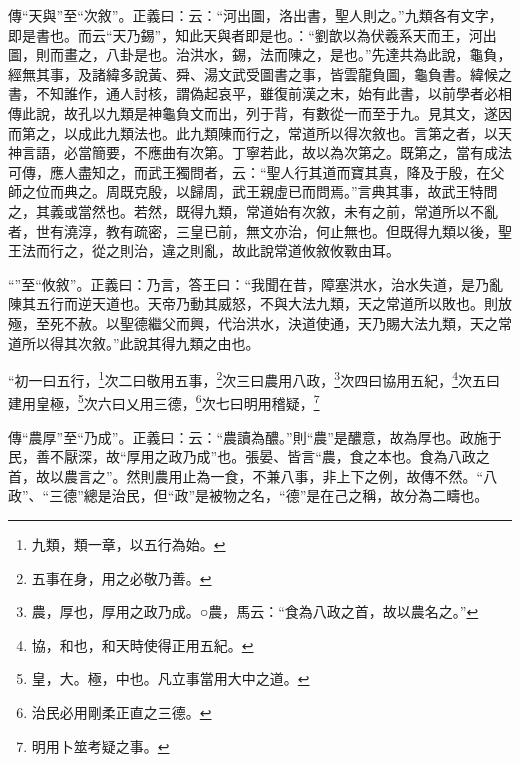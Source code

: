 {\noindent\zhuan{}\fzbyks 傳“天與”至“次敘”。正義曰：云：“河出圖，洛出書，聖人則之。”九類各有文字，即是書也。而云“天乃錫”，知此天與者即是也。：“劉歆以為伏羲系天而王，河出圖，則而畫之，八卦是也。治洪水，錫，法而陳之，是也。”先達共為此說，龜負，經無其事，及諸緯多說黃、舜、湯文武受圖書之事，皆雲龍負圖，龜負書。緯候之書，不知誰作，通人討核，謂偽起哀平，雖復前漢之末，始有此書，以前學者必相傳此說，故孔以九類是神龜負文而出，列于背，有數從一而至于九。見其文，遂因而第之，以成此九類法也。此九類陳而行之，常道所以得次敘也。言第之者，以天神言語，必當簡要，不應曲有次第。丁寧若此，故以為次第之。既第之，當有成法可傳，應人盡知之，而武王獨問者，云：“聖人行其道而寶其真，降及于殷，在父師之位而典之。周既克殷，以歸周，武王親虛已而問焉。”言典其事，故武王特問之，其義或當然也。若然，既得九類，常道始有次敘，未有之前，常道所以不亂者，世有澆淳，教有疏密，三皇已前，無文亦治，何止無也。但既得九類以後，聖王法而行之，從之則治，違之則亂，故此說常道攸敘攸斁由耳。 \par}

{\noindent\shu{}\fzkt “”至“攸敘”。正義曰：乃言，答王曰：“我聞在昔，障塞洪水，治水失道，是乃亂陳其五行而逆天道也。天帝乃動其威怒，不與大法九類，天之常道所以敗也。則放殛，至死不赦。以聖德繼父而興，代治洪水，決道使通，天乃賜大法九類，天之常道所以得其次敘。”此說其得九類之由也。 \par}

“初一曰五行，\footnote{九類，類一章，以五行為始。}次二曰敬用五事，\footnote{五事在身，用之必敬乃善。}次三曰農用八政，\footnote{農，厚也，厚用之政乃成。○農，馬云：“食為八政之首，故以農名之。”}次四曰協用五紀，\footnote{協，和也，和天時使得正用五紀。}次五曰建用皇極，\footnote{皇，大。極，中也。凡立事當用大中之道。}次六曰乂用三德，\footnote{治民必用剛柔正直之三德。}次七曰明用稽疑，\footnote{明用卜筮考疑之事。}


{\noindent\zhuan{}\fzbyks 傳“農厚”至“乃成”。正義曰：云：“農讀為醲。”則“農”是醲意，故為厚也。政施于民，善不厭深，故“厚用之政乃成”也。張晏、皆言“農，食之本也。食為八政之首，故以農言之”。然則農用止為一食，不兼八事，非上下之例，故傳不然。“八政”、“三德”總是治民，但“政”是被物之名，“德”是在己之稱，故分為二疇也。 \par}

